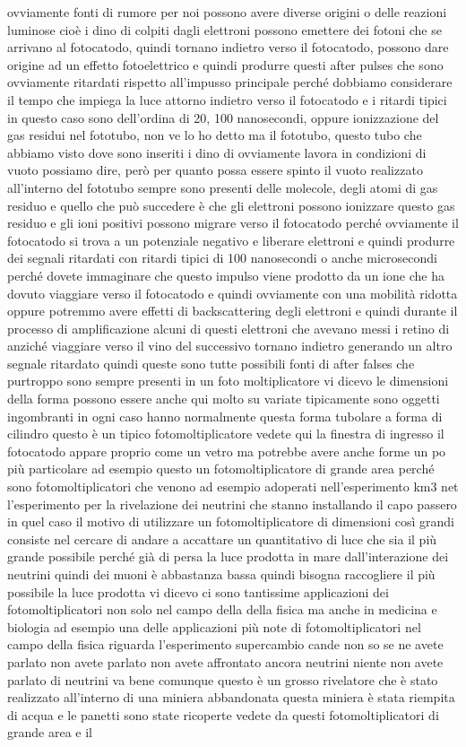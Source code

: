 {ovviamente fonti di rumore per noi possono avere diverse origini o delle reazioni luminose cioè i dino di colpiti dagli elettroni possono emettere dei fotoni che se arrivano al fotocatodo, quindi tornano indietro verso il fotocatodo, possono dare origine ad un effetto fotoelettrico e quindi produrre questi after pulses che sono ovviamente ritardati rispetto all'impusso principale perché dobbiamo considerare il tempo che impiega la luce attorno indietro verso il fotocatodo e i ritardi tipici in questo caso sono dell'ordina di 20, 100 nanosecondi, oppure ionizzazione del gas residui nel fototubo, non ve lo ho detto ma il fototubo, questo tubo che abbiamo visto dove sono inseriti i dino di ovviamente lavora in condizioni di vuoto possiamo dire, però per quanto possa essere spinto il vuoto realizzato all'interno del fototubo sempre sono presenti delle molecole, degli atomi di gas residuo e quello che può succedere è che gli elettroni possono ionizzare questo gas residuo e gli ioni positivi possono migrare verso il fotocatodo perché ovviamente il fotocatodo si trova a un potenziale negativo e liberare elettroni e quindi produrre dei segnali ritardati con ritardi tipici di 100 nanosecondi o anche microsecondi perché dovete immaginare che questo impulso viene prodotto da un ione che ha dovuto viaggiare verso il fotocatodo e quindi ovviamente con una mobilità ridotta oppure potremmo avere effetti di backscattering degli elettroni e quindi durante il processo di amplificazione alcuni di questi elettroni che avevano messi i retino di anziché viaggiare verso il vino del successivo tornano indietro generando un altro segnale ritardato quindi queste sono tutte possibili fonti di after falses che purtroppo sono sempre presenti in un foto moltiplicatore vi dicevo le dimensioni della forma possono essere anche qui molto su variate tipicamente sono oggetti ingombranti in ogni caso hanno normalmente questa forma tubolare a forma di cilindro questo è un tipico fotomoltiplicatore vedete qui la finestra di ingresso il fotocatodo appare proprio come un vetro ma potrebbe avere anche forme un po più particolare ad esempio questo un fotomoltiplicatore di grande area perché sono fotomoltiplicatori che venono ad esempio adoperati nell'esperimento km3 net l'esperimento per la rivelazione dei neutrini che stanno installando il capo passero in quel caso il motivo di utilizzare un fotomoltiplicatore di dimensioni così grandi consiste nel cercare di andare a accattare un quantitativo di luce che sia il più grande possibile perché già di persa la luce prodotta in mare dall'interazione dei neutrini quindi dei muoni è abbastanza bassa quindi bisogna raccogliere il più possibile la luce prodotta vi dicevo ci sono tantissime applicazioni dei fotomoltiplicatori non solo nel campo della della fisica ma anche in medicina e biologia ad esempio una delle applicazioni più note di fotomoltiplicatori nel campo della fisica riguarda l'esperimento supercambio cande non so se ne avete parlato non avete parlato non avete affrontato ancora neutrini niente non avete parlato di neutrini va bene comunque questo è un grosso rivelatore che è stato realizzato all'interno di una miniera abbandonata questa miniera è stata riempita di acqua e le panetti sono state ricoperte vedete da questi fotomoltiplicatori di grande area e il }
